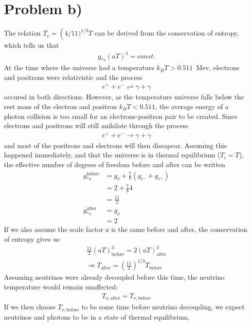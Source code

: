 \documentclass[reprint,english,notitlepage]{revtex4-1}  %
\numberwithin{equation}{section}
\begin{document}
\section{Problem b)}
The relation $T_\nu = \left(4/11)^{1/3} T$ can be derived from the conservation
of entropy, which tells us that
\begin{align}
	g_{*s}(aT)^3 = const.
\end{align}
At the time where the universe had a temperature $k_B T > 0.511$ Mev, electrons
and positrons were relativistic and the process
\begin{align}
	e^+ + e^- \rightleftharpoons \gamma + \gamma
\end{align}
occured in both directions. However, as the temperature universe falls below the
rest mass of the electron and positron $k_B T < 0.511$, the average energy of a
photon collision is too small for an electrons-positron pair to be created.
Since electrons and positrons will still anihilate through the process
\begin{align}
	e^+ + e^- \rightarrow \gamma + \gamma
\end{align}
and most of the positrons and electrons will then dissapear. Assuming this happened
immediately, and that the universe is in thermal equilibrium ($T_i=T$), the
effective number of degrees of freedom before and after can be written
\begin{align}
	g_{*s}^\mathrm{before} &= g_\nu + \frac{7}{8}(g_{e^-} + g_{e^+}) \\
									&= 2 + \frac{7}{8}4 \\
									&= \frac{11}{2} \\
	g_{*s}^\mathrm{after} &= g_\nu \\
								 &= 2
\end{align}
If we also assume the scale factor $a$ is the same before and after, the
conservation of entropy gives us
\begin{align}
	\frac{11}{2}(aT)_\mathrm{before}^3 = 2(aT)_\mathrm{after}^3 \\
	\Rightarrow T_\mathrm{after} = (\frac{11}{4})^{1/3} T_\mathrm{before}
\end{align}
Assuming neutrinos were already decoupled before this time, the neutrino temperature
would remain unaffected:
\begin{align}
	T_{\nu,\mathrm{after}} = T_{\nu,\mathrm{before}}
\end{align}
If we then choose $T_{\nu,\mathrm{before}}$ to be some time before neutrino decoupling,
we expect neutrinos and photons to be in a state of thermal equilibrium,
\end{document}

